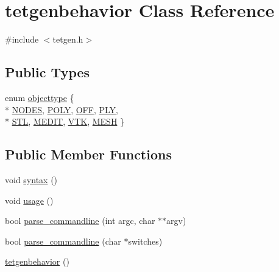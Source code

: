 \hypertarget{classtetgenbehavior}{}\section{tetgenbehavior Class Reference}
\label{classtetgenbehavior}


{\ttfamily \#include $<$tetgen.\+h$>$}

\subsection*{Public Types}
\begin{DoxyCompactItemize}
\item 
enum \hyperlink{classtetgenbehavior_aeea08e7334fde4251b74a8247bcc54b8}{objecttype} \{ \\*
\hyperlink{classtetgenbehavior_aeea08e7334fde4251b74a8247bcc54b8a0dea21ab467c34ea234e50fad62ab476}{N\+O\+D\+ES}, 
\hyperlink{classtetgenbehavior_aeea08e7334fde4251b74a8247bcc54b8a29f2ee4cb708a9575042633e91d31053}{P\+O\+LY}, 
\hyperlink{classtetgenbehavior_aeea08e7334fde4251b74a8247bcc54b8ac89624c6ccf5322957838b09dd8bc234}{O\+FF}, 
\hyperlink{classtetgenbehavior_aeea08e7334fde4251b74a8247bcc54b8afefe2d8d24bdcc0165c20ac6427570b2}{P\+LY}, 
\\*
\hyperlink{classtetgenbehavior_aeea08e7334fde4251b74a8247bcc54b8a730e79948156f1850aa12bd6884d0c2e}{S\+TL}, 
\hyperlink{classtetgenbehavior_aeea08e7334fde4251b74a8247bcc54b8a00e5944100c4edb8136b9a7a08956fec}{M\+E\+D\+IT}, 
\hyperlink{classtetgenbehavior_aeea08e7334fde4251b74a8247bcc54b8a20dc5e713ee0d2cb7564ad72a9bcdd59}{V\+TK}, 
\hyperlink{classtetgenbehavior_aeea08e7334fde4251b74a8247bcc54b8a7643bd97f77bf992963f18bfa2fdc54d}{M\+E\+SH}
 \}
\end{DoxyCompactItemize}
\subsection*{Public Member Functions}
\begin{DoxyCompactItemize}
\item 
void \hyperlink{classtetgenbehavior_a6e22cb6ec468a3b0a5fc45fcb4d9709c}{syntax} ()
\item 
void \hyperlink{classtetgenbehavior_aa0bf59fe9ca35269d58e5f1ee10aca05}{usage} ()
\item 
bool \hyperlink{classtetgenbehavior_a240b6eb4bee021fc945ca8b01f7b7b9f}{parse\+\_\+commandline} (int argc, char $\ast$$\ast$argv)
\item 
bool \hyperlink{classtetgenbehavior_abf5ad80b5b6900296253c6126f667fe2}{parse\+\_\+commandline} (char $\ast$switches)
\item 
\hyperlink{classtetgenbehavior_aa9c947b94b6b238e3aeedd7eb029667e}{tetgenbehavior} ()
\end{DoxyCompactItemize}
